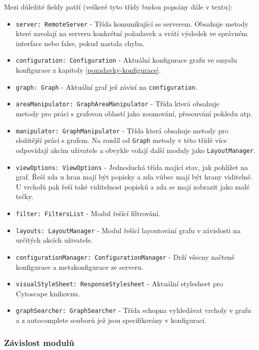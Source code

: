 Mezi důležité fieldy patří (veškeré tyto třídy budou popsány dále v textu):
\begin{itemize}
  \item \texttt{server: RemoteServer} - Třída komunikující se serverem. Obsahuje metody které zavolají na serveru konkrétní požadavek a vrátí výsledek ve správném interface nebo false, pokud nastala chyba.
  \item \texttt{configuration: Configuration} - Aktuální konfigurace grafu ve smyslu konfigurace z kapitoly \ref{pozadavky-konfigurace}.
  \item \texttt{graph: Graph} - Aktuální graf jež závisí na \texttt{configuration}.
  \item \texttt{areaManipulator: GraphAreaManipulator} - Třída která obsahuje \\ metody pro práci s grafovou oblastí jako zoomování, přesouvání pohledu atp.
  \item \texttt{manipulator: GraphManipulator} - Třída která obsahuje metody pro složitější práci s grafem. Na rozdíl od \texttt{Graph} metody v této třídě více odpovídají akcím uživatele a obvykle volají další moduly jako \texttt{LayoutManager}.
  \item \texttt{viewOptions: ViewOptions} - Jednoduchá třída mající stav, jak pohlížet na graf. Řeší zda u hran mají být popisky a zda vůbec mají být hrany viditelné. U vrcholů pak řeší také viditelnost popisků a zda se mají zobrazit jako malé tečky.
  \item \texttt{filter: FiltersList} - Modul řešící filtrování.
  \item \texttt{layouts: LayoutManager} - Modul řešící layoutování grafu v závislosti na určitých akcích uživatele.
  \item \texttt{configurationManager: ConfigurationManager} - Drží všecny načtené konfigurace a metakonfigurace ze serveru.
  \item \texttt{visualStyleSheet: ResponseStylesheet} - Aktuální stylesheet pro \\ Cytoscape knihovnu.
  \item \texttt{graphSearcher: GraphSearcher} - Třída schopna vyhledávat vrcholy v grafu a z autocomplete souborů jež jsou specifikovány v konfiguraci.
\end{itemize}

\subsubsection{Závislost modulů}

